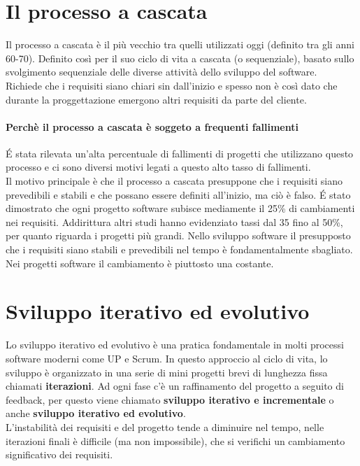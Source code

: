 \section{Il processo a cascata}
Il processo a cascata è il più vecchio tra quelli utilizzati oggi (definito tra gli
anni 60-70). Definito così per il suo ciclo di vita a cascata (o sequenziale),
basato sullo svolgimento sequenziale delle diverse attività dello sviluppo del software.
\\ Richiede che i requisiti siano chiari sin dall'inizio e spesso non è così dato
che durante la proggettazione emergono altri requisiti da parte del cliente.
\paragraph{Perchè il processo a cascata è soggeto a frequenti fallimenti}
\'E stata rilevata un'alta percentuale di fallimenti di progetti che utilizzano questo processo
e ci sono diversi motivi legati a questo alto tasso di fallimenti.
\\ Il motivo principale è che il processo a cascata presuppone che i requisiti siano
prevedibili e stabili e che possano essere definiti all'inizio, ma ciò è falso.
\' E stato dimostrato che ogni progetto software subisce mediamente il 25\% di cambiamenti
nei requisiti. Addirittura altri studi hanno evidenziato tassi dal 35 fino al 50\%, per quanto
riguarda i progetti più grandi.
Nello sviluppo software il presupposto che i requisiti siano stabili e prevedibili nel tempo
è fondamentalmente sbagliato. Nei progetti software il cambiamento è piuttosto una
costante.
\section{Sviluppo iterativo ed evolutivo}
Lo sviluppo iterativo ed evolutivo è una pratica fondamentale in molti processi
software moderni come UP e Scrum. In questo approccio al ciclo di vita,
lo sviluppo è organizzato in una serie di mini progetti brevi di lunghezza fissa
chiamati \textbf{iterazioni}. Ad ogni fase c'è un raffinamento del progetto a seguito
di feedback, per questo viene chiamato \textbf{sviluppo iterativo e incrementale}
o anche \textbf{sviluppo iterativo ed evolutivo}.
\\ L'instabilità dei requisiti e del progetto tende a diminuire nel tempo, 
nelle iterazioni finali è difficile (ma non impossibile), che si verifichi un
cambiamento significativo dei requisiti.
